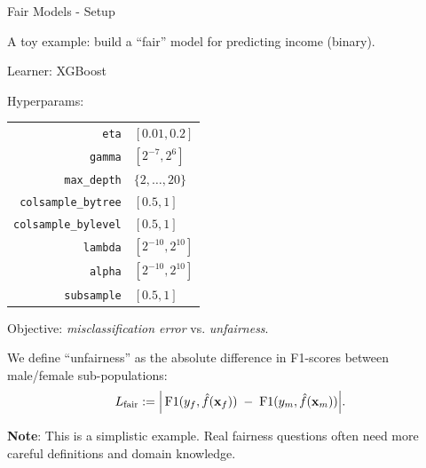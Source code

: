 \documentclass[11pt,compress,t,notes=noshow,xcolor=table]{beamer}
\begin{document}
\begin{vbframe}{Fair Models - Setup}

A toy example: build a “fair” model for predicting income (binary).

\begin{itemize}{\small
  \item Learner: XGBoost
  \item Hyperparams:
    \begin{tabular}{rl}
      \texttt{eta} & $[0.01, 0.2]$ \\
      \texttt{gamma} & $[2^{-7}, 2^6]$ \\
      \texttt{max\_depth} & $\{2, \dots, 20\}$ \\
      \texttt{colsample\_bytree} & $[0.5,1]$ \\
      \texttt{colsample\_bylevel} & $[0.5,1]$ \\
      \texttt{lambda} & $[2^{-10},2^{10}]$ \\
      \texttt{alpha} & $[2^{-10},2^{10}]$ \\
      \texttt{subsample} & $[0.5,1]$
    \end{tabular}
  \item Objective: \emph{misclassification error} vs. \emph{unfairness}.
  \item We define “unfairness” as the absolute difference in F1-scores between male/female sub-populations:
  \[
    L_{\mathrm{fair}} := 
      \Bigl|\,
        \mathrm{F1}(y_f,\hat{f}(\mathbf{x}_f)) 
          \;-\;
        \mathrm{F1}(y_m,\hat{f}(\mathbf{x}_m))
      \Bigr|.
  \]}
\end{itemize}

\textbf{Note}: This is a simplistic example. Real fairness questions often need more careful definitions and domain knowledge.

\end{vbframe}
\end{document}
